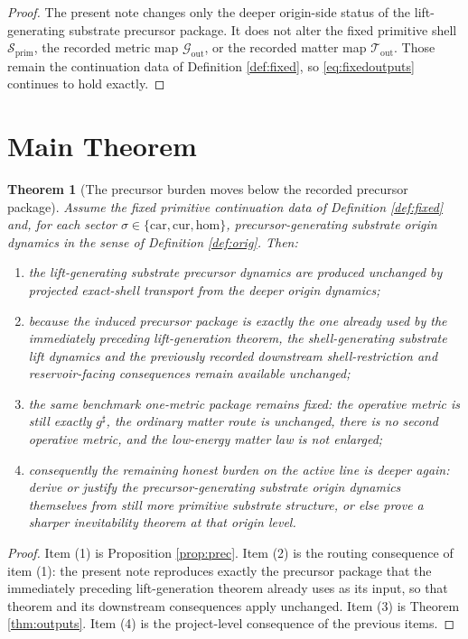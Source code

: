 \documentclass[11pt]{article}
\newcommand{\CompletedMetric}{g^{\sharp}}
\newcommand{\Car}{\mathrm{car}}
\newcommand{\Cur}{\mathrm{cur}}
\newcommand{\Hom}{\mathrm{hom}}
\newcommand{\PrimShell}{\mathcal S_{\mathrm{prim}}}
\newcommand{\MetricOut}{\mathscr G_{\mathrm{out}}}
\newcommand{\MatterOut}{\mathscr T_{\mathrm{out}}}
\newtheorem{theorem}{Theorem}
\begin{document}
\begin{proof}
The present note changes only the deeper origin-side status of the lift-generating substrate precursor package. It does not alter the fixed primitive shell \(\PrimShell\), the recorded metric map \(\MetricOut\), or the recorded matter map \(\MatterOut\). Those remain the continuation data of Definition \ref{def:fixed}, so \eqref{eq:fixedoutputs} continues to hold exactly.
\end{proof}

\section{Main Theorem}

\begin{theorem}[The precursor burden moves below the recorded precursor package]
\label{thm:main}
Assume the fixed primitive continuation data of Definition \ref{def:fixed} and, for each sector \(\sigma\in\{\Car,\Cur,\Hom\}\), precursor-generating substrate origin dynamics in the sense of Definition \ref{def:orig}. Then:
\begin{enumerate}
    \item the lift-generating substrate precursor dynamics are produced unchanged by projected exact-shell transport from the deeper origin dynamics;
    \item because the induced precursor package is exactly the one already used by the immediately preceding lift-generation theorem, the shell-generating substrate lift dynamics and the previously recorded downstream shell-restriction and reservoir-facing consequences remain available unchanged;
    \item the same benchmark one-metric package remains fixed: the operative metric is still exactly \(\CompletedMetric\), the ordinary matter route is unchanged, there is no second operative metric, and the low-energy matter law is not enlarged;
    \item consequently the remaining honest burden on the active line is deeper again: derive or justify the precursor-generating substrate origin dynamics themselves from still more primitive substrate structure, or else prove a sharper inevitability theorem at that origin level.
\end{enumerate}
\end{theorem}

\begin{proof}
Item (1) is Proposition \ref{prop:prec}. Item (2) is the routing consequence of item (1): the present note reproduces exactly the precursor package that the immediately preceding lift-generation theorem already uses as its input, so that theorem and its downstream consequences apply unchanged. Item (3) is Theorem \ref{thm:outputs}. Item (4) is the project-level consequence of the previous items.
\end{proof}
\end{document}
